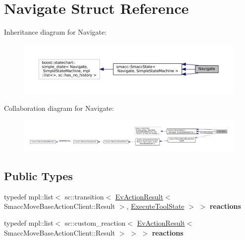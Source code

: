 \hypertarget{structNavigate}{}\section{Navigate Struct Reference}
\label{structNavigate}


Inheritance diagram for Navigate\+:
\nopagebreak
\begin{figure}[H]
\begin{center}
\leavevmode
\includegraphics[width=350pt]{structNavigate__inherit__graph}
\end{center}
\end{figure}


Collaboration diagram for Navigate\+:
\nopagebreak
\begin{figure}[H]
\begin{center}
\leavevmode
\includegraphics[width=350pt]{structNavigate__coll__graph}
\end{center}
\end{figure}
\subsection*{Public Types}
\begin{DoxyCompactItemize}
\item 
\mbox{\label{structNavigate_afdad91862c4900a993cc6e44309e807a}} 
typedef mpl\+::list$<$ sc\+::transition$<$ \hyperlink{structsmacc_1_1EvActionResult}{Ev\+Action\+Result}$<$ Smacc\+Move\+Base\+Action\+Client\+::\+Result $>$, \hyperlink{structExecuteToolState}{Execute\+Tool\+State} $>$ $>$ {\bfseries reactions}
\item 
\mbox{\label{structNavigate_a7948e7393b5358874dede3754b993e73}} 
typedef mpl\+::list$<$ sc\+::custom\+\_\+reaction$<$ \hyperlink{structsmacc_1_1EvActionResult}{Ev\+Action\+Result}$<$ Smacc\+Move\+Base\+Action\+Client\+::\+Result $>$ $>$ $>$ {\bfseries reactions}
\end{DoxyCompactItemize}
